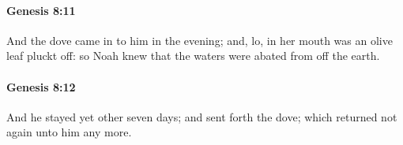 		\paragraph{Genesis 8:11} %
			\label{GENESIS-8-11}

			And the dove came in to him in the evening; and, lo, in her mouth was an olive leaf pluckt off: so Noah knew that the waters were abated from off the earth.


		\paragraph{Genesis 8:12} %
			\label{GENESIS-8-12}

			And he stayed yet other seven days; and sent forth the dove; which returned not again unto him any more.


